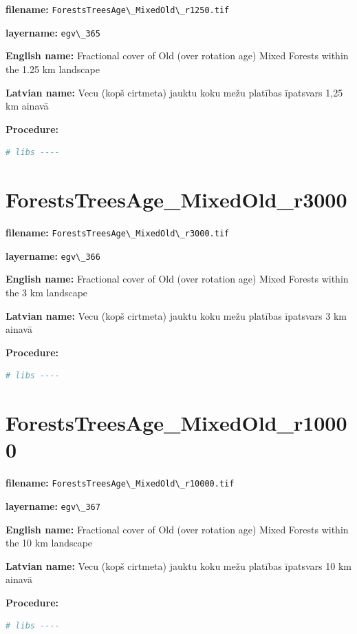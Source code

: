 \documentclass[
]{book}
\newcommand{\passthrough}[1]{#1}
\begin{document}
\textbf{filename:} \passthrough{\lstinline!ForestsTreesAge\_MixedOld\_r1250.tif!}

\textbf{layername:} \passthrough{\lstinline!egv\_365!}

\textbf{English name:} Fractional cover of Old (over rotation age) Mixed Forests within the 1.25 km landscape

\textbf{Latvian name:} Vecu (kopš cirtmeta) jauktu koku mežu platības īpatsvars 1,25 km ainavā

\textbf{Procedure:}

\begin{lstlisting}[language=R]
# libs ----
\end{lstlisting}

\section{ForestsTreesAge\_MixedOld\_r3000}\label{ch06.366}

\textbf{filename:} \passthrough{\lstinline!ForestsTreesAge\_MixedOld\_r3000.tif!}

\textbf{layername:} \passthrough{\lstinline!egv\_366!}

\textbf{English name:} Fractional cover of Old (over rotation age) Mixed Forests within the 3 km landscape

\textbf{Latvian name:} Vecu (kopš cirtmeta) jauktu koku mežu platības īpatsvars 3 km ainavā

\textbf{Procedure:}

\begin{lstlisting}[language=R]
# libs ----
\end{lstlisting}

\section{ForestsTreesAge\_MixedOld\_r10000}\label{ch06.367}

\textbf{filename:} \passthrough{\lstinline!ForestsTreesAge\_MixedOld\_r10000.tif!}

\textbf{layername:} \passthrough{\lstinline!egv\_367!}

\textbf{English name:} Fractional cover of Old (over rotation age) Mixed Forests within the 10 km landscape

\textbf{Latvian name:} Vecu (kopš cirtmeta) jauktu koku mežu platības īpatsvars 10 km ainavā

\textbf{Procedure:}

\begin{lstlisting}[language=R]
# libs ----
\end{lstlisting}
\end{document}
